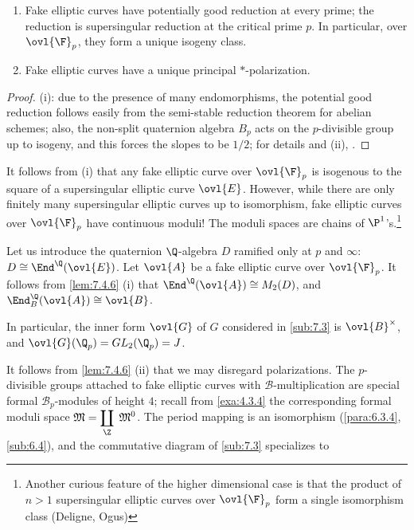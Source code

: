 \begin{lem}\label{lem:7.4.6}
 \begin{enumerate}
  \item Fake elliptic curves have potentially good reduction at every
	prime; the reduction is supersingular reduction at the critical
	prime $p$. In particular, over $\ovl{\F}_p$,
	they form a unique isogeny class.
  \item Fake elliptic curves have a unique principal $\ast$-polarization.
 \end{enumerate}
\end{lem}

\begin{proof}
 (i): due to the presence of many endomorphisms, the potential good
 reduction follows easily from the semi-stable reduction theorem for
 abelian schemes; also, the non-split quaternion algebra $B_p$ acts on
 the $p$-divisible group up to isogeny, and this forces the slopes to be
 $1/2$; for details and (ii), \cf \cite[III]{updcds}.
\end{proof}

 It follows from (i) that any fake elliptic curve over
 $\ovl{\F}_p$ is isogenous to the square of a supersingular elliptic
 curve $\ovl{E}$.  However, while there are only finitely many
 supersingular elliptic curves up to isomorphism, fake elliptic curves
 over $\ovl{\F}_p$ have continuous moduli! The moduli spaces are chains
 of $\P^1$'s.\footnote{Another curious feature of the higher
 dimensional case is that the product of $n > 1$ supersingular elliptic
 curves over $\ovl{\F}_p$ form a single isomorphism class (Deligne,
 Ogus)}

 Let us introduce the quaternion $\Q$-algebra $D$ ramified only
 at $p$ and $\infty$: $D\cong \End^\Q(\ovl{E})$. 
 Let $\ovl{A}$ be a fake elliptic curve over $\ovl{\F}_p$. It follows from
 \ref{lem:7.4.6} (i) that $\End^\Q(\ovl{A})\cong M_2(D)$, and $\End_{B}^\Q
 (\ovl{A})\cong \ovl{B}$.  

 In particular, the inner form $\ovl{G}$ of $G$ considered in \ref{sub:7.3} is
 $\ovl{B}^\times$, and $\ovl{G}(\Q_p)=GL_2(\Q_p)=J$.  

 It follows from \ref{lem:7.4.6} (ii) that we may disregard polarizations. The
 $p$-divisible groups attached to fake elliptic curves with
 $\mathcal{B}$-multiplication are special formal $\mathcal{B}_p$-modules
 of height $4$; recall from \ref{exa:4.3.4} the corresponding formal
 moduli space 
 $\displaystyle \mathfrak{M} = \coprod_\Z\;\mathfrak{M}^0$. The period
 mapping is an isomorphism (\ref{para:6.3.4}, \ref{sub:6.4}), and the
 commutative diagram of \ref{sub:7.3} specializes to

